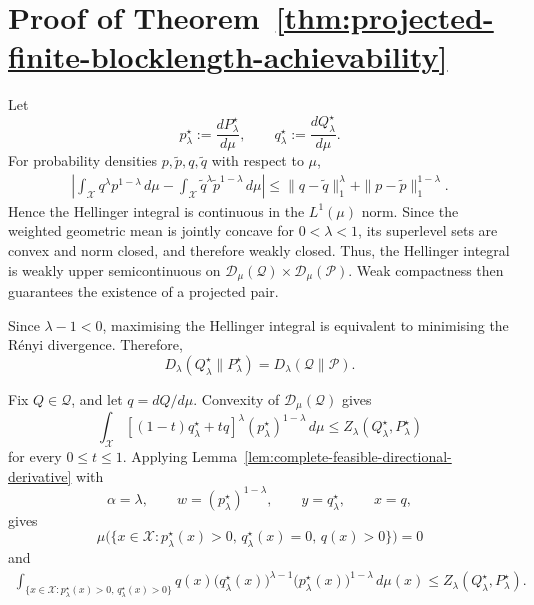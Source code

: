 \documentclass[journal,12pt,draftclsnofoot,onecolumn]{IEEEtran}
\begin{document}
\section{Proof of Theorem~\ref{thm:projected-finite-blocklength-achievability}}
\label{app:projected-finite-blocklength-achievability}
\begin{IEEEproof}
Let
\begin{equation*}
p_\lambda^\star
:=
\frac{dP_\lambda^\star}{d\mu},
\qquad
q_\lambda^\star
:=
\frac{dQ_\lambda^\star}{d\mu}.
\end{equation*}
For probability densities $p,\widetilde p,q,\widetilde q$ with respect
to $\mu$,
\begin{equation*}
\begin{aligned}
\left|
\int_{\mathcal X}
q^\lambda p^{1-\lambda}\,d\mu
-
\int_{\mathcal X}
\widetilde q^\lambda\widetilde p^{1-\lambda}\,d\mu
\right|
\leq
\|q-\widetilde q\|_1^\lambda
+
\|p-\widetilde p\|_1^{1-\lambda}.
\end{aligned}
\end{equation*}
Hence the Hellinger integral is continuous in the $L^1(\mu)$ norm.
Since the weighted geometric mean is jointly concave for
$0<\lambda<1$, its superlevel sets are convex and norm closed, and
therefore weakly closed. Thus, the Hellinger integral is weakly upper
semicontinuous on
$\mathcal D_\mu(\mathcal Q)\times\mathcal D_\mu(\mathcal P)$.
Weak compactness then guarantees the existence of a projected pair.

Since $\lambda-1<0$, maximising the Hellinger integral is equivalent to
minimising the R\'enyi divergence. Therefore,
\begin{equation*}
D_\lambda(Q_\lambda^\star\|P_\lambda^\star)
=
D_\lambda(\mathcal Q\|\mathcal P).
\end{equation*}

Fix $Q\in\mathcal Q$, and let $q=dQ/d\mu$. Convexity of
$\mathcal D_\mu(\mathcal Q)$ gives
\begin{equation*}
\int_{\mathcal X}
\left[
(1-t)q_\lambda^\star+tq
\right]^\lambda
(p_\lambda^\star)^{1-\lambda}\,d\mu
\leq
Z_\lambda(Q_\lambda^\star,P_\lambda^\star)
\end{equation*}
for every $0\leq t\leq1$. Applying
Lemma~\ref{lem:complete-feasible-directional-derivative} with
\begin{equation*}
\alpha=\lambda,
\qquad
w=(p_\lambda^\star)^{1-\lambda},
\qquad
y=q_\lambda^\star,
\qquad
x=q,
\end{equation*}
gives
\begin{equation*}
\mu\bigl(
\{x\in\mathcal X:
p_\lambda^\star(x)>0,\,
q_\lambda^\star(x)=0,\,
q(x)>0\}
\bigr)
=
0
\end{equation*}
and
\begin{equation*}
\begin{aligned}
\int_{\{x\in\mathcal X:
p_\lambda^\star(x)>0,\,
q_\lambda^\star(x)>0\}}
q(x)
\bigl(q_\lambda^\star(x)\bigr)^{\lambda-1}
\bigl(p_\lambda^\star(x)\bigr)^{1-\lambda}
\,d\mu(x)
\leq
Z_\lambda(Q_\lambda^\star,P_\lambda^\star).
\end{aligned}
\end{equation*}


\end{IEEEproof}
\end{document}
